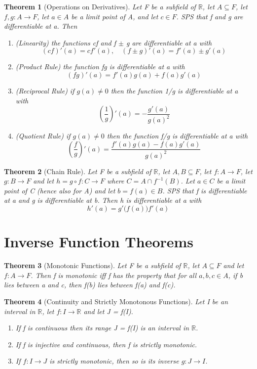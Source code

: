 \documentclass[11pt, oneside]{book}
\theoremstyle{break}
\newtheorem{thm}{Theorem}[section]
\newcommand{\bb}[1]{\mathbb{#1}}		%
\begin{document}
\begin{thm}[Operations on Derivatives]
	Let F be a subfield of $\bb{R}$, let $A \subseteq F$, let $f, g: A \to F$, let $a \in A$ be a limit point of A, and let $c \in F$. SPS that f and g are differentiable at a. Then
	\begin{enumerate}
		\item (Linearity) the functions cf and f $\pm$ g are differentiable at a with
			\[
				(cf)'(a) = cf'(a), \quad (f \pm g)'(a) = f'(a) \pm g'(a)
			\]
		\item (Product Rule) the function fg is differentiable at a with
			\[
				(fg)'(a) = f'(a)g(a) + f(a)g'(a)
			\]
		\item (Reciprocal Rule) if $g(a) \neq 0$ then the function 1/g is differentiable at a with
			\[
				(\frac{1}{g})'(a) = -\frac{g'(a)}{g(a)^2}
			\]
		\item (Quotient Rule) if $g(a) \neq 0$ then the function f/g is differentiable at a with
			\[
				(\frac{f}{g})'(a) = \frac{f'(a)g(a) - f(a)g'(a)}{g(a)^2}
			\]
	\end{enumerate}
\end{thm}

\begin{thm}[Chain Rule]
	Let F be a subfield of $\bb{R}$, let $A, B \subseteq F$, let $f: A \to F$, let $g:B \to F$ and let $h = g \circ f: C \to F$ where $C = A \cap f^{-1}(B)$. Let $a \in C$ be a limit point of C (hence also for A) and let $b = f(a) \in B$. SPS that f is differentiable at a and g is differentiable at b. Then h is differentiable at a with
	\[
		h'(a) = g'\big( f(a) \big)f'(a)
	\]
\end{thm}


\section{Inverse Function Theorems}

\begin{thm}[Monotonic Functions]
	Let F be a subfield of $\bb{R}$, let $A \subseteq F$ and let $f: A \to F$. Then f is monotonic iff f has the property that for all $a, b, c \in A$, if b lies between a and c, then f(b) lies between f(a) and f(c).
\end{thm}

\begin{thm}[Continuity and Strictly Monotonous Functions]
	Let I be an interval in $\bb{R}$, let $f: I \to \bb{R}$ and let J = f(I).
	\begin{enumerate}
		\item If f is continuous then its range J = f(I) is an interval in $\bb{R}$.
		\item If f is injective and continuous, then f is strictly monotonic.
		\item If $f: I \to J$ is strictly monotonic, then so is its inverse $g: J \to I$.
	\end{enumerate}
\end{thm}
\end{document}
